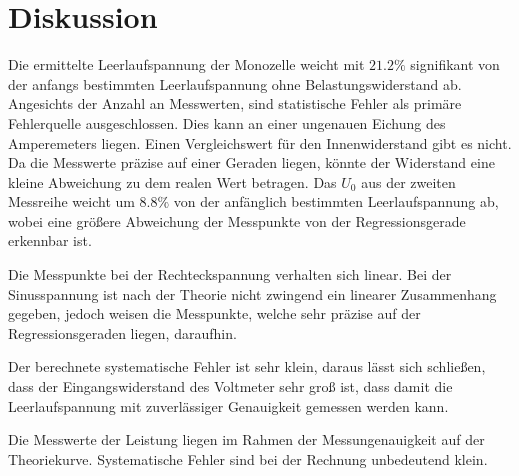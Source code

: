 \section{Diskussion}
\label{sec:Diskussion}

Die ermittelte Leerlaufspannung der Monozelle weicht mit $21.2 \%$ signifikant von der anfangs bestimmten Leerlaufspannung ohne
Belastungswiderstand ab. Angesichts der Anzahl an Messwerten, sind statistische Fehler als primäre Fehlerquelle ausgeschlossen.
Dies kann an einer ungenauen Eichung des Amperemeters liegen. Einen Vergleichswert für
den Innenwiderstand gibt es nicht. Da die Messwerte präzise auf einer Geraden liegen, könnte der Widerstand
eine kleine Abweichung zu dem realen Wert betragen. Das $U_0$ aus der zweiten Messreihe weicht um $8.8\%$
von der anfänglich bestimmten Leerlaufspannung ab, wobei eine größere Abweichung der Messpunkte von der Regressionsgerade
erkennbar ist.

Die Messpunkte bei der Rechteckspannung verhalten sich linear. Bei der
Sinusspannung ist nach der Theorie nicht zwingend ein linearer Zusammenhang gegeben, jedoch weisen die Messpunkte, welche
sehr präzise auf der Regressionsgeraden liegen, daraufhin.

Der berechnete systematische Fehler ist sehr klein, daraus lässt sich schließen, dass der Eingangswiderstand des
Voltmeter sehr groß ist, dass damit die Leerlaufspannung mit zuverlässiger Genauigkeit gemessen werden kann.

Die Messwerte der Leistung liegen im Rahmen der Messungenauigkeit auf der Theoriekurve. Systematische Fehler
sind bei der Rechnung unbedeutend klein.
